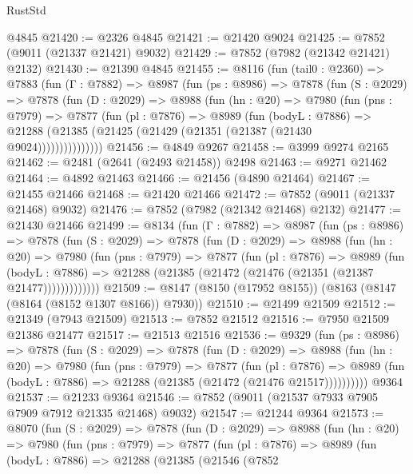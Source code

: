 \begin{lexlean}{RustStd}
\begin{coremodule}
    @4845
@21420 := @2326 @4845
@21421 := @21420 @9024
@21425 := @7852 (@9011 (@21337 @21421) @9032)
@21429 := @7852 (@7982 (@21342 @21421) @2132)
@21430 := @21390 @4845
@21455 := @8116
    (fun (tail0 : @2360) =>
    @7883
      (fun (Γ : @7882) =>
      @8987
        (fun (ps : @8986) =>
        @7878
          (fun (S : @2029) =>
          @7878
            (fun (D : @2029) =>
            @8988
              (fun (hn : @20) =>
              @7980
                (fun (pns : @7979) =>
                @7877
                  (fun (pl : @7876) =>
                  @8989
                    (fun (bodyL : @7886) =>
                    @21288 (@21385 (@21425 (@21429 (@21351 (@21387 (@21430 @9024)))))))))))))))
@21456 := @4849 @9267
@21458 := @3999 @9274 @2165
@21462 := @2481 (@2641 (@2493 @21458)) @2498
@21463 := @9271 @21462
@21464 := @4892 @21463
@21466 := @21456 (@4890 @21464)
@21467 := @21455 @21466
@21468 := @21420 @21466
@21472 := @7852 (@9011 (@21337 @21468) @9032)
@21476 := @7852 (@7982 (@21342 @21468) @2132)
@21477 := @21430 @21466
@21499 := @8134
    (fun (Γ : @7882) =>
    @8987
      (fun (ps : @8986) =>
      @7878
        (fun (S : @2029) =>
        @7878
          (fun (D : @2029) =>
          @8988
            (fun (hn : @20) =>
            @7980
              (fun (pns : @7979) =>
              @7877
                (fun (pl : @7876) =>
                @8989
                  (fun (bodyL : @7886) =>
                  @21288 (@21385 (@21472 (@21476 (@21351 (@21387 @21477)))))))))))))
@21509 := @8147 (@8150 (@17952 @8155)) (@8163 (@8147 (@8164 (@8152 @1307 @8166)) @7930))
@21510 := @21499 @21509
@21512 := @21349 (@7943 @21509)
@21513 := @7852 @21512
@21516 := @7950 @21509 @21386 @21477
@21517 := @21513 @21516
@21536 := @9329
    (fun (ps : @8986) =>
    @7878
      (fun (S : @2029) =>
      @7878
        (fun (D : @2029) =>
        @8988
          (fun (hn : @20) =>
          @7980
            (fun (pns : @7979) =>
            @7877
              (fun (pl : @7876) =>
              @8989 (fun (bodyL : @7886) => @21288 (@21385 (@21472 (@21476 @21517))))))))))
    @9364
@21537 := @21233 @9364
@21546 := @7852 (@9011 (@21537 @7933 @7905 @7909 @7912 @21335 @21468) @9032)
@21547 := @21244 @9364
@21573 := @8070
    (fun (S : @2029) =>
    @7878
      (fun (D : @2029) =>
      @8988
        (fun (hn : @20) =>
        @7980
          (fun (pns : @7979) =>
          @7877
            (fun (pl : @7876) =>
            @8989
              (fun (bodyL : @7886) =>
              @21288
                (@21385
                  (@21546
                    (@7852

\end{coremodule}
\end{lexlean}
